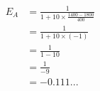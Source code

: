 \documentclass[preview]{standalone}
\begin{document}
\begin{align*}
E_A &= \frac{1}{1 + 10 \times \frac{1400 - 1800}{400}} \\ &= \frac{1}{1 + 10 \times (-1)} \\ &= \frac{1}{1 - 10} \\ &= \frac{1}{-9} \\ &= -0.111...
\end{align*}
\end{document}
